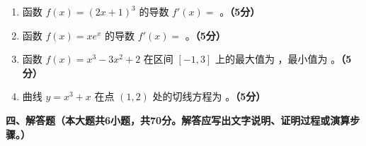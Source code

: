 \documentclass[12pt, a4paper]{ctexart}
\newcommand{\score}[1]{\hfill\textbf{（#1分）}}
\begin{document}
\begin{enumerate}[resume]
\item 函数 $f(x)=(2x+1)^3$ 的导数 $f'(x)=$ \underline{\hspace{3cm}}。\score{5}

\item 函数 $f(x)=xe^x$ 的导数 $f'(x)=$ \underline{\hspace{3cm}}。\score{5}

\item 函数 $f(x)=x^3-3x^2+2$ 在区间 $[-1,3]$ 上的最大值为 \underline{\hspace{2cm}}，最小值为 \underline{\hspace{2cm}}。\score{5}

\item 曲线 $y=x^3+x$ 在点 $(1,2)$ 处的切线方程为 \underline{\hspace{5cm}}。\score{5}
\end{enumerate}

\vspace{1em}

\noindent\textbf{四、解答题（本大题共6小题，共70分。解答应写出文字说明、证明过程或演算步骤。）}

\vspace{0.5em}
\end{document}
